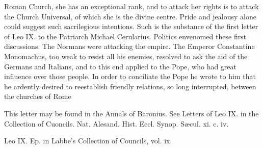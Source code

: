 Roman Church, she has an exceptional rank, and to attack her rights is to attack the Church Universal, of which she is the divine centre. Pride and jealousy alone could suggest such sacrilegious intentions. Such is the substance of the first letter of Leo IX. to the Patriarch Michael Cerularius. Politics envenomed these first discussions. The Normans were attacking the empire. The Emperor Constantine Monomachus, too weak to resist all his enemies, resolved to ask the aid of the Germans and Italians, and to this end applied to the Pope, who had great influence over those people. In order to conciliate the Pope he wrote to him that he ardently desired to reestablish friendly relations, so long interrupted, between the churches of Rome

This letter may be found in the Annals of Baronius. See Letters of Leo IX. in the Collection of Cuoncils. Nat. Alesand. Hist. Eccl. Synop. Sæcul. xi. c. iv.

Leo IX. Ep. in Labbe’s Collection of Councils, vol. ix.

